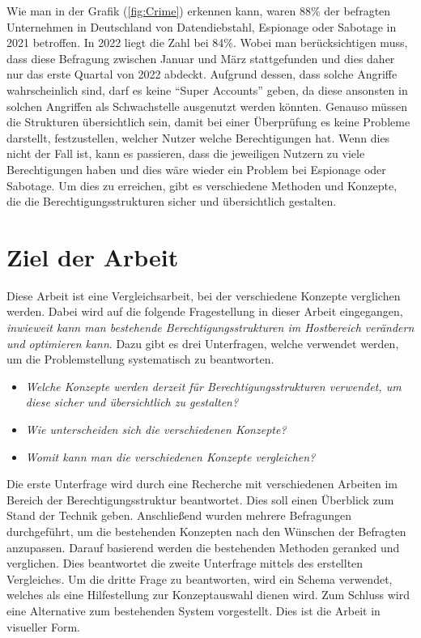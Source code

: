 Wie man in der Grafik (\ref{fig:Crime}) erkennen kann, waren 88\% der befragten Unternehmen in Deutschland von Datendiebstahl, Espionage oder Sabotage in 2021 betroffen.
In 2022 liegt die Zahl bei 84\%.
Wobei man berücksichtigen muss, dass diese Befragung zwischen Januar und März stattgefunden und dies daher nur das erste Quartal von 2022 abdeckt.
Aufgrund dessen, dass solche Angriffe wahrscheinlich sind, darf es keine "`Super Accounts"' geben, da diese ansonsten in solchen Angriffen als Schwachstelle ausgenutzt werden könnten.
Genauso müssen die Strukturen übersichtlich sein, damit bei einer Überprüfung es keine Probleme darstellt, festzustellen, welcher Nutzer welche Berechtigungen hat.
Wenn dies nicht der Fall ist, kann es passieren, dass die jeweiligen Nutzern zu viele Berechtigungen haben und dies wäre wieder ein Problem bei Espionage oder Sabotage.
Um dies zu erreichen, gibt es verschiedene Methoden und Konzepte, die die Berechtigungsstrukturen sicher und übersichtlich gestalten.

%
%
\section{Ziel der Arbeit}
\label{sec:intro:goal}
Diese Arbeit ist eine Vergleichsarbeit, bei der verschiedene Konzepte verglichen werden.
Dabei wird auf die folgende Fragestellung in dieser Arbeit eingegangen, \textit{inwieweit kann man bestehende Berechtigungsstrukturen im Hostbereich verändern und optimieren kann}.
Dazu gibt es drei Unterfragen, welche verwendet werden, um die Problemstellung systematisch zu beantworten.

\begin{itemize}
  \item \textit{Welche Konzepte werden derzeit für Berechtigungsstrukturen verwendet, um diese sicher und übersichtlich zu gestalten?}
  \item \textit{Wie unterscheiden sich die verschiedenen Konzepte?}
  \item \textit{Womit kann man die verschiedenen Konzepte vergleichen?}
\end{itemize}

Die erste Unterfrage wird durch eine Recherche mit verschiedenen Arbeiten im Bereich der Berechtigungsstruktur beantwortet.
Dies soll einen Überblick zum Stand der Technik geben.
Anschließend wurden mehrere Befragungen durchgeführt, um die bestehenden Konzepten nach den Wünschen der Befragten anzupassen.
Darauf basierend werden die bestehenden Methoden geranked und verglichen.
Dies beantwortet die zweite Unterfrage mittels des erstellten Vergleiches.
\newline
Um die dritte Frage zu beantworten, wird ein Schema verwendet, welches als eine Hilfestellung zur Konzeptauswahl dienen wird.
Zum Schluss wird eine Alternative zum bestehenden System vorgestellt.
Dies ist die Arbeit in visueller Form.

